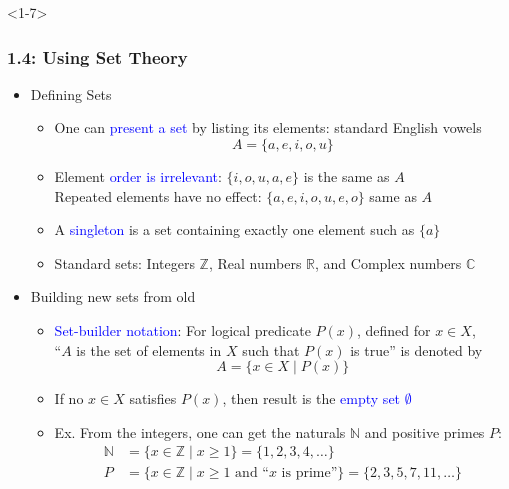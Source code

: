 \documentclass[10pt,english,aspectratio=169]{beamer}
\begin{document}
\begin{frame}<1-7> \frametitle{1.4: Using Set Theory}

\begin{itemize}
\setlength\itemsep{2.5mm}
\item<1-> Defining Sets \vspace{1mm}
\begin{itemize} 
  \setlength\itemsep{1.5mm}
  \item<1-> One can \textcolor{blue}{present a set} by listing its elements: standard English vowels \[A= \{ a,e,i,o,u \} \]
  \item<2-> Element \textcolor{blue}{order is irrelevant}: $\{ i,o,u,a,e \}$ is the same as $A$ \\[0.5mm] Repeated elements have no effect: $\{ a,e,i,o,u,e,o \}$ same as $A$
  \item<3-> A \textcolor{blue}{singleton} is a set containing exactly one element such as $\{a\}$
  \item<4-> Standard sets: Integers $\mathbb{Z}$, Real numbers $\mathbb{R}$, and Complex numbers $\mathbb{C}$
\end{itemize}

\item<5-> Building new sets from old \vspace{1mm}
\begin{itemize} 
  \setlength\itemsep{1mm}
  \item \textcolor{blue}{Set-builder notation}: For logical predicate $P(x)$, defined for $x\in X$,\\[0.5mm]  ``$A$ is the set of elements in $X$ such that $P(x)$ is true'' is denoted by
\[ A = \{ x\in X \mid  P(x) \} \]
  \item<6-> If no $x\in X$ satisfies $P(x)$, then result is the \textcolor{blue}{empty set $\emptyset$}
  \item<7-> Ex. From the integers, one can get the naturals $\mathbb{N}$ and positive primes $P$:
\begin{align*}
  \mathbb{N} &= \{ x\in \mathbb{Z} \mid  x\geq 1 \} = \{ 1,2,3,4,\ldots \} \\
  P &= \{ x\in \mathbb{Z} \mid x\geq 1 \textrm{ and ``}x\textrm{ is prime''} \} = \{ 2,3,5,7,11,\ldots \}
\end{align*}
\end{itemize}
\end{itemize}


\end{frame}
\end{document}
